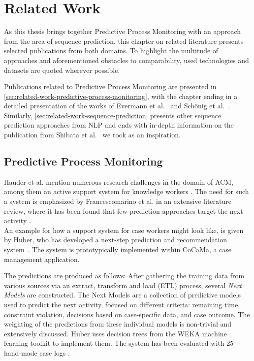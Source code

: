 \chapter{Related Work}\label{chap:related-work}
As this thesis brings together Predictive Process Monitoring with an approach from the area of sequence prediction, this chapter on related literature presents selected publications from both domains. To highlight the multitude of approaches and aforementioned obstacles to comparability, used technologies and datasets are quoted wherever possible.

Publications related to Predictive Process Monitoring are presented in \autoref{sec:related-work-predictive-process-monitoring}, with the chapter ending in a detailed presentation of the works of Evermann et al.~\cite{evermann2016} and Schönig et al.~\cite{schoenig2018}. Similarly, \autoref{sec:related-work-sequence-prediction} presents other sequence prediction approaches from NLP and ends with in-depth information on the publication from Shibata et al.~\cite{shibata2016bipartite} we took as an inspiration.

\section{Predictive Process Monitoring}
\label{sec:related-work-predictive-process-monitoring}
Hauder et al. mention numerous research challenges in the domain of ACM, among them an active support system for knowledge workers \cite{hauder2014}.
The need for such a system is emphasized by Francescomarino et al. in an extensive literature review, where it has been found that few prediction approaches target the next activity \cite{francescomarino2018}.\\

An example for how a support system \cite{hauder2014} for case workers might look like, is given by Huber, who has developed a next-step prediction and recommendation system~\cite{huber2015}. The system is prototypically implemented within CoCaMa, a case management application.

The predictions are produced as follows: After gathering the training data from various sources via an extract, transform and load (ETL) process, several \textit{Next Models} are constructed. The Next Models are a collection of predictive models used to predict the next activity, focused on different criteria: remaining time, constraint violation, decisions based on case-specific data, and case outcome. The weighting of the predictions from these individual models is non-trivial and extensively discussed. Huber uses decision trees from the WEKA \cite{web:weka} machine learning toolkit to implement them. The system has been evaluated with 25 hand-made case logs \cite{huber2015}.\\

